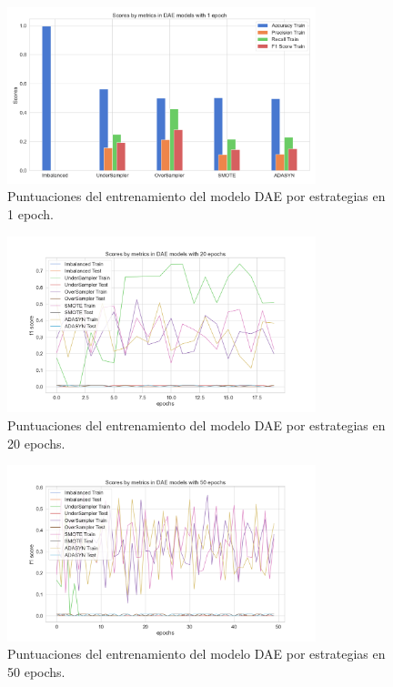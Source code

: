 \begin{figure}[h!]
	\centering
	\includegraphics[width=0.8\textwidth]{"figuras/Experimento5/DAE/DAE_1_train"}
	\caption{Puntuaciones del entrenamiento del modelo DAE por estrategias en 1 epoch.}
	\label{an:35}
\end{figure}

\begin{figure}[h!]
	\centering
	\includegraphics[width=0.8\textwidth]{"figuras/Experimento5/DAE/DAE_20_train"}
	\caption{Puntuaciones del entrenamiento del modelo DAE por estrategias en 20 epochs.}
	\label{an:36}
\end{figure}

\begin{figure}[h!]
	\centering
	\includegraphics[width=0.8\textwidth]{"figuras/Experimento5/DAE/DAE_50_train"}
	\caption{Puntuaciones del entrenamiento del modelo DAE por estrategias en 50 epochs.}
	\label{an:37}
\end{figure}

